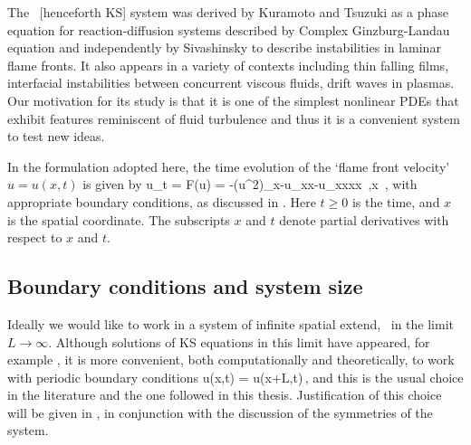 
The \KS\ [henceforth KS] system was derived by
Kuramoto and Tsuzuki as a phase equation for
reaction-diffusion systems described by Complex Ginzburg-Landau
equation and independently by Sivashinsky to describe
instabilities in laminar flame fronts. It also appears
in a variety of contexts including thin falling
films, interfacial instabilities between
concurrent viscous fluids, drift waves in plasmas.
Our motivation for its study is that it is one of the simplest
nonlinear PDEs that exhibit features reminiscent of fluid
turbulence and thus it is a convenient system to test new ideas.

 In the formulation
adopted here, the time evolution of the `flame front velocity'
$u=u(x,t)$ %
is given by
\beq
  u_t = F(u) = -{\textstyle{}}(u^2)_x-u_{xx}-u_{xxxx}
    \,,\qquad   x \in [-L/2,L/2]
    \,,
with appropriate boundary conditions, as discussed in .
Here $t \geq 0$ is the time, and $x$ is the spatial coordinate.
The subscripts $x$ and $t$ denote partial derivatives with respect to
$x$ and $t$.

\subsection{Boundary conditions and system size}
\label{sec:KSbc}

Ideally we would like to work in a system of infinite spatial extend, \ie\ in the limit $L\rightarrow\infty$.
Although solutions of KS equations in this limit have appeared, \cf for example , it is
more convenient, both computationally and theoretically, to work with periodic boundary conditions
\beq
  u(x,t) = u(x+L,t)\,,
 \label{eq:KSper}
\eeq
and this is the usual choice in the literature and the one followed in this thesis.
Justification of this choice will be given
in , in conjunction with the discussion of the symmetries of the system.

